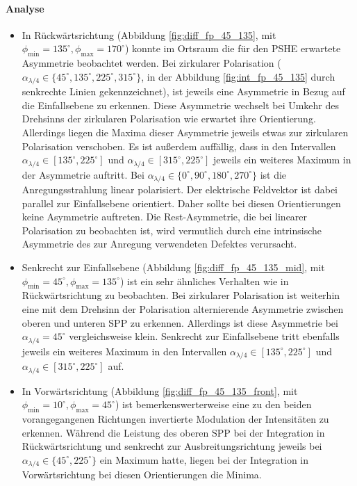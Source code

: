 \documentclass[a4paper, titlepage,  ngerman]{book}
\begin{document}
		\paragraph{Analyse}
			\begin{itemize}
				\item In Rückwärtsrichtung (Abbildung \ref{fig:diff_fp_45_135},  mit $\phi_\mathrm{min} =135^\circ, \phi_\mathrm{max}=170^\circ$) konnte im Ortsraum die für den PSHE erwartete Asymmetrie beobachtet werden. Bei zirkularer Polarisation ($\alpha_{\lambda/4} \in \{45^\circ, 135^\circ, 225^\circ, 315^\circ\}$, in der Abbildung \ref{fig:int_fp_45_135} durch senkrechte Linien gekennzeichnet), ist jeweils eine Asymmetrie in Bezug auf die Einfallsebene zu erkennen. Diese Asymmetrie wechselt bei Umkehr des Drehsinns der zirkularen Polarisation wie erwartet ihre Orientierung. Allerdings liegen die Maxima dieser Asymmetrie jeweils etwas zur zirkularen Polarisation verschoben. Es ist außerdem auffällig, dass in den Intervallen $\alpha_{\lambda/4} \in [135^\circ,225^\circ]$ und $\alpha_{\lambda/4} \in [315^\circ, 225^\circ]$ jeweils ein weiteres Maximum in der Asymmetrie auftritt. Bei $\alpha_{\lambda/4} \in \{0^\circ, 90^\circ, 180^\circ, 270^\circ\}$ ist die Anregungsstrahlung linear polarisiert. Der elektrische Feldvektor ist dabei parallel zur Einfallsebene orientiert. Daher sollte bei diesen Orientierungen keine Asymmetrie auftreten. Die Rest-Asymmetrie, die bei linearer Polarisation zu beobachten ist, wird vermutlich durch eine intrinsische Asymmetrie des zur Anregung verwendeten Defektes verursacht. 
				\item Senkrecht zur Einfallsebene (Abbildung \ref{fig:diff_fp_45_135_mid},  mit $\phi_\mathrm{min} =45^\circ, \phi_\mathrm{max}=135^\circ$) ist ein sehr ähnliches Verhalten wie in Rückwärtsrichtung zu beobachten. Bei zirkularer Polarisation ist weiterhin eine mit dem Drehsinn der Polarisation alternierende Asymmetrie zwischen oberen und unteren SPP zu erkennen. Allerdings ist diese Asymmetrie bei $\alpha_{\lambda/4}=45^\circ$ vergleichsweise klein. Senkrecht zur Einfallsebene tritt ebenfalls jeweils ein weiteres Maximum in den Intervallen $\alpha_{\lambda/4} \in [135^\circ,225^\circ]$ und $\alpha_{\lambda/4} \in [315^\circ, 225^\circ]$ auf.
				\item
				In Vorwärtsrichtung (Abbildung \ref{fig:diff_fp_45_135_front},  mit  $\phi_\mathrm{min} =10^\circ, \phi_\mathrm{max}=45^\circ$) ist bemerkenswerterweise eine zu den beiden vorangegangenen Richtungen invertierte Modulation der Intensitäten zu erkennen. Während die Leistung des oberen SPP bei der Integration in Rückwärtsrichtung und senkrecht zur Ausbreitungsrichtung jeweils bei $\alpha_{\lambda /4} \in \{45^\circ, 225^\circ\}$ ein Maximum hatte, liegen bei der Integration in Vorwärtsrichtung bei diesen Orientierungen die Minima.
			\end{itemize}
		\FloatBarrier
\end{document}
